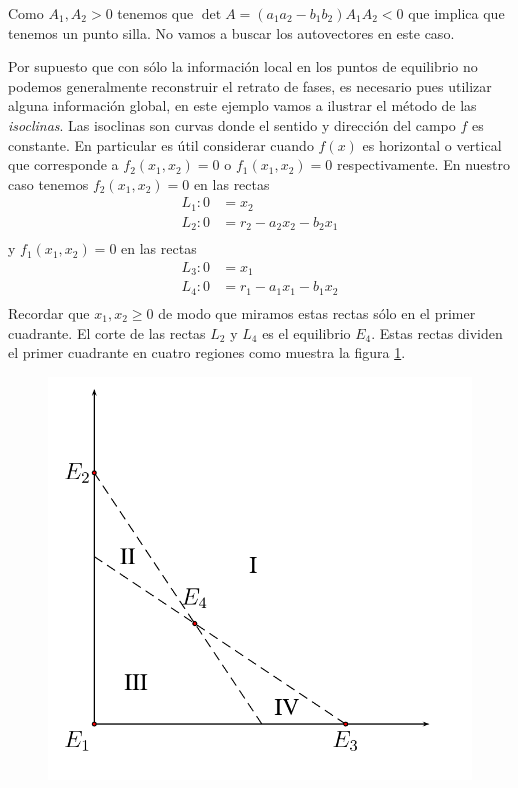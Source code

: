 Como $A_1,A_2>0$ tenemos que $\det A=(a_1a_2-b_1b_2)A_1A_2<0$ que
implica que tenemos un punto silla. No vamos a buscar los
autovectores en este caso.

Por supuesto que con sólo la información local en los puntos de
equilibrio no podemos generalmente reconstruir el retrato de
fases, es necesario pues utilizar alguna información global, en
este ejemplo vamos a ilustrar el método de las \emph{isoclinas}.
Las isoclinas son curvas donde el sentido y dirección del campo
$f$ es constante. En particular es útil considerar cuando $f(x)$
es horizontal o vertical que corresponde a $f_2(x_1,x_2)=0$ o
$f_1(x_1,x_2)=0$ respectivamente. En nuestro caso tenemos
$f_2(x_1,x_2)=0$  en las rectas
\[
\begin{split}
    L_1:0&=x_2\\
    L_2:0&=r_2-a_2x_2-b_2x_1\\
\end{split}
\]
y $f_1(x_1,x_2)=0$  en las rectas
\[
\begin{split}
    L_3:0&=x_1\\
    L_4:0&=r_1-a_1x_1-b_1x_2\\
\end{split}
\]
Recordar que $x_1,x_2\geq 0$ de modo que miramos estas rectas sólo
en el primer cuadrante. El corte de las rectas $L_2$ y $L_4$ es el
equilibrio $E_4$. Estas rectas dividen el primer cuadrante en
cuatro regiones como muestra la figura \ref{regionesbio}.
\begin{figure}[h]
\begin{center}
\includegraphics[scale=.4]{imagenes/EspCompI.png}
\end{center}
\caption{}\label{regionesbio}
\end{figure}

